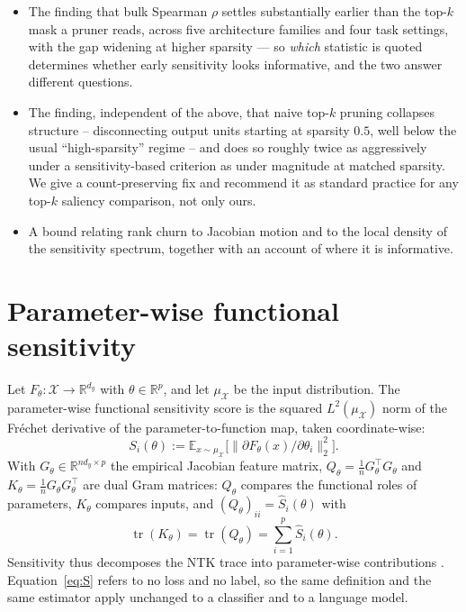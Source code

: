 \documentclass{article}
\begin{document}
\begin{itemize}
\item The finding that bulk Spearman $\rho$ settles substantially earlier than the top-$k$
  mask a pruner reads, across five architecture families and four task settings, with the
  gap widening at higher sparsity --- so \emph{which} statistic is quoted determines
  whether early sensitivity looks informative, and the two answer different questions.
\item The finding, independent of the above, that naive top-$k$ pruning collapses structure
  -- disconnecting output units starting at sparsity $0.5$, well below the usual
  ``high-sparsity'' regime -- and does so roughly twice as aggressively under a
  sensitivity-based criterion as under magnitude at matched sparsity. We give a
  count-preserving fix and recommend it as standard practice for any top-$k$ saliency
  comparison, not only ours.
\item A bound relating rank churn to Jacobian motion and to the local density of the
  sensitivity spectrum, together with an account of where it is informative.
\end{itemize}

\section{Parameter-wise functional sensitivity}
\label{sec:sensitivity}

Let $F_\theta:\mathcal X\to\mathbb R^{d_y}$ with $\theta\in\mathbb R^p$, and let
$\mu_{\mathcal X}$ be the input distribution. The parameter-wise functional sensitivity
score is the squared $L^2(\mu_{\mathcal X})$ norm of the Fr\'echet derivative of the
parameter-to-function map, taken coordinate-wise:
\begin{equation}
  S_i(\theta):=\mathbb E_{x\sim\mu_{\mathcal X}}
  \big[\|\partial F_\theta(x)/\partial\theta_i\|_2^2\big].
  \label{eq:S}
\end{equation}
With $G_\theta\in\mathbb R^{nd_y\times p}$ the empirical Jacobian feature matrix,
$Q_\theta=\tfrac1n G_\theta^\top G_\theta$ and $K_\theta=\tfrac1n G_\theta G_\theta^\top$
are dual Gram matrices: $Q_\theta$ compares the functional roles of parameters, $K_\theta$
compares inputs, and $(Q_\theta)_{ii}=\widehat S_i(\theta)$ with
\begin{equation}
  \operatorname{tr}(K_\theta)=\operatorname{tr}(Q_\theta)=\textstyle\sum_{i=1}^p\widehat S_i(\theta).
  \label{eq:trace}
\end{equation}
Sensitivity thus decomposes the NTK trace into parameter-wise contributions
\citep{jacot2018ntk}. Equation~\eqref{eq:S} refers to no loss and no label, so the same
definition and the same estimator apply unchanged to a classifier and to a language model.
\end{document}
